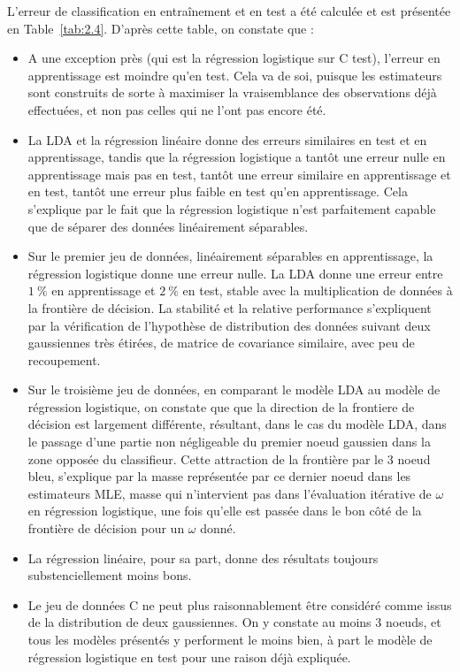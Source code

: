 \documentclass[12pt,a4paper,onecolumn]{article}
\begin{document}
L'erreur de classification en entraînement et en test a été calculée et est présentée en Table~\ref{tab:2.4}. D'après cette table, on constate que :
\begin{itemize}
	\item A une exception près (qui est la régression logistique sur C test), l'erreur en apprentissage est moindre qu'en test. Cela va de soi, puisque les estimateurs sont construits de sorte à maximiser la vraisemblance des observations déjà effectuées, et non pas celles qui ne l'ont pas encore été.
	\item La LDA et la régression linéaire donne des erreurs similaires en test et en apprentissage, tandis que la régression logistique a tantôt une erreur nulle en apprentissage mais pas en test, tantôt une erreur similaire en apprentissage et en test, tantôt une erreur plus faible en test qu'en apprentissage. Cela s'explique par le fait que la régression logistique n'est parfaitement capable que de séparer des données linéairement séparables.
	\item Sur le premier jeu de données, linéairement séparables en apprentissage, la régression logistique donne une erreur nulle. La LDA donne une erreur entre \( 1~\%\) en apprentissage et \(2~\%\) en test, stable avec la multiplication de données à la frontière de décision. La stabilité et la relative performance s'expliquent par la vérification de l'hypothèse de distribution des données suivant deux gaussiennes très étirées, de matrice de covariance similaire, avec peu de recoupement.
	\item Sur le troisième jeu de données, en comparant le modèle LDA au modèle de régression logistique, on constate que que la direction de la frontiere de décision est largement différente, résultant, dans le cas du modèle LDA, dans le passage d'une partie non négligeable du premier noeud gaussien dans la zone opposée du classifieur. Cette attraction de la frontière par le 3 noeud bleu, s'explique par la masse représentée par ce dernier noeud dans les estimateurs MLE, masse qui n'intervient pas dans l'évaluation itérative de \( \omega \) en régression logistique, une fois qu'elle est passée dans le bon côté de la frontière de décision pour un \( \omega\) donné.
	\item La régression linéaire, pour sa part, donne des résultats toujours substenciellement moins bons.
	\item Le jeu de données C ne peut plus raisonnablement être considéré comme issus de la distribution de deux gaussiennes. On y constate au moins 3 noeuds, et tous les modèles présentés y performent le moins bien, à part le modèle de régression logistique en test pour une raison déjà expliquée.
\end{itemize}
\end{document}
